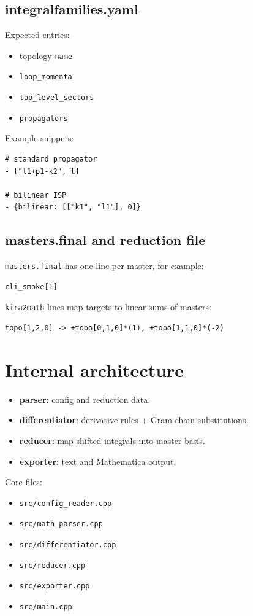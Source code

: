 \documentclass[11pt,openany]{report}
\newcommand{\code}[1]{\texttt{#1}}
\begin{document}
\section{integralfamilies.yaml}
Expected entries:
\begin{itemize}
  \item topology \code{name}
  \item \code{loop\_momenta}
  \item \code{top\_level\_sectors}
  \item \code{propagators}
\end{itemize}

Example snippets:
\begin{verbatim}
# standard propagator
- ["l1+p1-k2", t]

# bilinear ISP
- {bilinear: [["k1", "l1"], 0]}
\end{verbatim}

\section{masters.final and reduction file}
\code{masters.final} has one line per master, for example:
\begin{verbatim}
cli_smoke[1]
\end{verbatim}

\code{kira2math} lines map targets to linear sums of masters:
\begin{verbatim}
topo[1,2,0] -> +topo[0,1,0]*(1), +topo[1,1,0]*(-2)
\end{verbatim}

\chapter{Internal architecture}
\begin{itemize}
  \item \textbf{parser}: config and reduction data.
  \item \textbf{differentiator}: derivative rules + Gram-chain substitutions.
  \item \textbf{reducer}: map shifted integrals into master basis.
  \item \textbf{exporter}: text and Mathematica output.
\end{itemize}

Core files:
\begin{itemize}
  \item \code{src/config\_reader.cpp}
  \item \code{src/math\_parser.cpp}
  \item \code{src/differentiator.cpp}
  \item \code{src/reducer.cpp}
  \item \code{src/exporter.cpp}
  \item \code{src/main.cpp}
\end{itemize}
\end{document}
